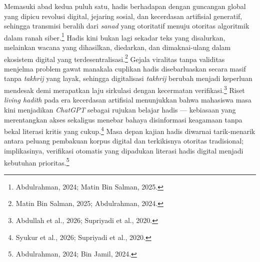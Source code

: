 Memasuki abad kedua puluh satu, hadis berhadapan dengan guncangan global yang dipicu revolusi digital, jejaring sosial, dan kecerdasan artifisial generatif, sehingga transmisi beralih dari \textit{sanad} yang otoritatif menuju otoritas algoritmik dalam ranah siber.\footnote{Abdulrahman, 2024; Matin Bin Salman, 2025.} Hadis kini bukan lagi sekadar teks yang disalurkan, melainkan wacana yang dihasilkan, diedarkan, dan dimaknai-ulang dalam ekosistem digital yang terdesentralisasi.\footnote{Matin Bin Salman, 2025; Abdulrahman, 2024.} Gejala viralitas tanpa validitas menjelma problem gawat manakala cuplikan hadis disebarluaskan secara masif tanpa \textit{takhrij} yang layak, sehingga digitalisasi \textit{takhrij} berubah menjadi keperluan mendesak demi merapatkan laju sirkulasi dengan kecermatan verifikasi.\footnote{Abdullah et al., 2026; Supriyadi et al., 2020.} Riset \textit{living hadith} pada era kecerdasan artifisial menunjukkan bahwa mahasiswa masa kini menjadikan \textit{ChatGPT} sebagai rujukan belajar hadis --- kebiasaan yang merentangkan akses sekaligus menebar bahaya disinformasi keagamaan tanpa bekal literasi kritis yang cukup.\footnote{Syukur et al., 2026; Supriyadi et al., 2020.} Masa depan kajian hadis diwarnai tarik-menarik antara peluang pembakuan korpus digital dan terkikisnya otoritas tradisional; implikasinya, verifikasi otomatis yang dipadukan literasi hadis digital menjadi kebutuhan prioritas.\footnote{Abdulrahman, 2024; Bin Jamil, 2024.}

